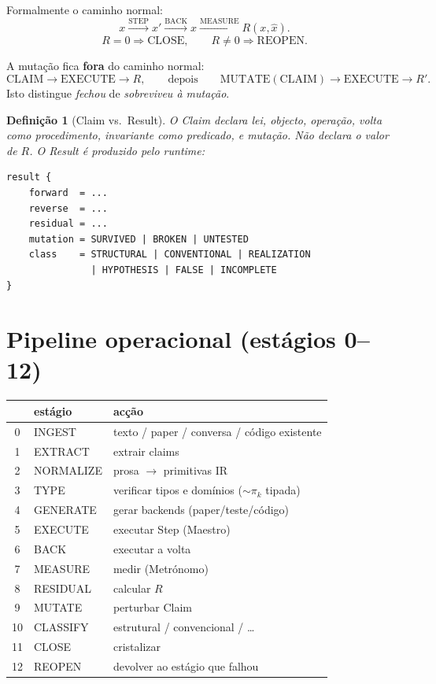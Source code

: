 \documentclass[11pt,a4paper]{article}
\newtheorem{definicao}[teorema]{Definição}
\begin{document}
Formalmente o caminho normal:
\[
x
\xrightarrow{\mathrm{STEP}}
x'
\xrightarrow{\mathrm{BACK}}
\hat{x}
\xrightarrow{\mathrm{MEASURE}}
R(x,\hat{x}).
\]
\[
R=0\Rightarrow\mathrm{CLOSE},
\qquad
R\neq0\Rightarrow\mathrm{REOPEN}.
\]

A mutação fica \textbf{fora} do caminho normal:
\[
\mathrm{CLAIM}\to\mathrm{EXECUTE}\to R,
\qquad\text{depois}\qquad
\mathrm{MUTATE}(\mathrm{CLAIM})\to\mathrm{EXECUTE}\to R'.
\]
Isto distingue \emph{fechou} de \emph{sobreviveu à mutação}.

\begin{definicao}[\textsf{Claim} vs.\ \textsf{Result}]\label{def:claim-result}
O Claim declara lei, objecto, operação, volta \emph{como procedimento},
invariante \emph{como predicado}, e mutação. Não declara o valor de $R$.
O Result é produzido pelo runtime:
\begin{verbatim}
result {
    forward  = ...
    reverse  = ...
    residual = ...
    mutation = SURVIVED | BROKEN | UNTESTED
    class    = STRUCTURAL | CONVENTIONAL | REALIZATION
               | HYPOTHESIS | FALSE | INCOMPLETE
}
\end{verbatim}
\end{definicao}

\section{Pipeline operacional (estágios 0--12)}\label{sec:estagios}

\begin{center}\small
\begin{tabular}{@{}clp{7.4cm}@{}}
\toprule
 & estágio & acção \\
\midrule
0 & INGEST & texto / paper / conversa / código existente \\
1 & EXTRACT & extrair claims \\
2 & NORMALIZE & prosa $\to$ primitivas IR \\
3 & TYPE & verificar tipos e domínios ($\sim\pi_k$ tipada) \\
4 & GENERATE & gerar backends (paper/teste/código) \\
5 & EXECUTE & executar Step (Maestro) \\
6 & BACK & executar a volta \\
7 & MEASURE & medir (Metrónomo) \\
8 & RESIDUAL & calcular $R$ \\
9 & MUTATE & perturbar Claim \\
10 & CLASSIFY & estrutural / convencional / \ldots \\
11 & CLOSE & cristalizar \\
12 & REOPEN & devolver ao estágio que falhou \\
\bottomrule
\end{tabular}
\end{center}
\end{document}
